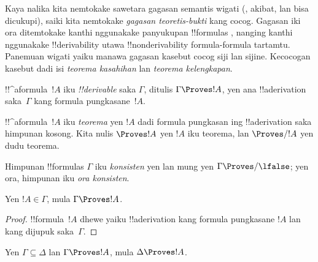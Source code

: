 \documentclass[../../../include/open-logic-section]{subfiles}
\begin{document}
      {}
      {}


\begin{explain}
Kaya nalika kita nemtokake sawetara gagasan semantis wigati
(, akibat, lan bisa dicukupi), saiki
kita nemtokake \emph{gagasan teoretis-bukti} kang cocog. Gagasan iki
ora ditemtokake kanthi nggunakake panyukupan !!{formula}s , nanging kanthi nggunakake !!{derivability} utawa
!!{nonderivability} formula-formula tartamtu. Panemuan wigati yaiku
manawa gagasan kasebut cocog siji lan sijine. Kecocogan kasebut dadi isi
\emph{teorema kasahihan} lan \emph{teorema kelengkapan}.
\end{explain}

\begin{defn}[!!^{derivability}]
!!^a{formula}~$!A$ iku \emph{!!{derivable}} saka $\Gamma$, ditulis
$\Gamma \Proves !A$, yen ana !!a{derivation} saka~$\Gamma$ kang
formula pungkasane~$!A$.
\end{defn}

\begin{defn}[Teorema]
!!^a{formula}~$!A$ iku \emph{teorema} yen $!A$ dadi formula pungkasan
ing !!a{derivation} saka himpunan kosong. Kita nulis $\Proves !A$ yen $!A$
iku teorema, lan $\Proves/ !A$ yen dudu teorema.
\end{defn}

\begin{defn}[Konsistensi]
Himpunan !!{formula}s $\Gamma$ iku \emph{konsisten} yen lan mung yen
$\Gamma\Proves/ \lfalse$; yen ora, himpunan iku \emph{ora konsisten}.
\end{defn}

\begin{prop}[Refleksivitas]
Yen $!A \in \Gamma$, mula $\Gamma \Proves !A$.
\end{prop}

\begin{proof}
  !!{formula}~$!A$ dhewe yaiku !!a{derivation} kang formula pungkasane
  $!A$ lan kang dijupuk saka~$\Gamma$.
\end{proof}

\begin{prop}[Monotonisitas]
Yen $\Gamma \subseteq \Delta$ lan $\Gamma \Proves !A$, mula $\Delta
\Proves !A$.
\end{prop}
\end{document}
